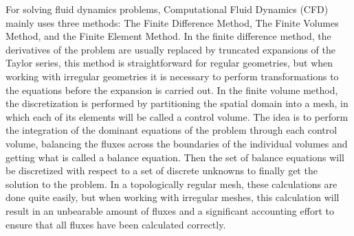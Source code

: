\documentclass[12pt,letterpaper]{article}
\begin{document}

For solving fluid dynamics problems, Computational Fluid Dynamics (CFD) mainly uses three methods: The Finite Difference Method, The Finite Volumes Method, and the Finite Element Method. In the finite difference method, the derivatives of the problem are usually replaced by truncated expansions of the Taylor series, this method is straightforward for regular geometries, but when working with irregular geometries it is necessary to perform transformations to the equations before the expansion is carried out\cite{AutoDesk}. In the finite volume method, the discretization is performed by partitioning the spatial domain into a mesh, in which each of its elements will be called a control volume. The idea is to perform the integration of the dominant equations of the problem through each control volume, balancing the fluxes across the boundaries of the individual volumes and getting what is called a balance equation. Then the set of balance equations will be discretized with respect to a set of discrete unknowns to finally get the solution to the problem\cite{volumes}. In a topologically regular mesh, these calculations are done quite easily, but when working with irregular meshes, this calculation will result in an unbearable amount of fluxes and a significant accounting effort to ensure that all fluxes have been calculated correctly\cite{AutoDesk}.\\
\end{document}
